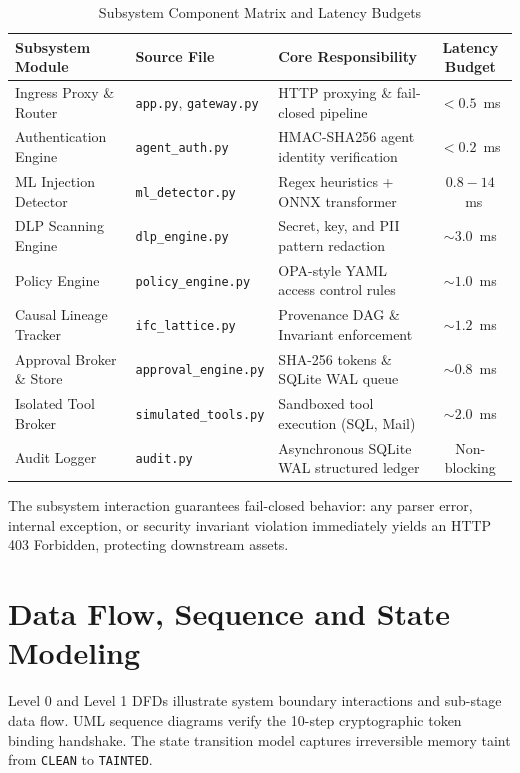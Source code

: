 \begin{table}[htbp]
\centering
\caption{Subsystem Component Matrix and Latency Budgets}
\label{tab:subsystem_matrix}
\begin{tabular}{l l p{5.5cm} c}
\toprule
\textbf{Subsystem Module} & \textbf{Source File} & \textbf{Core Responsibility} & \textbf{Latency Budget} \\
\midrule
Ingress Proxy \& Router & \texttt{app.py}, \texttt{gateway.py} & HTTP proxying \& fail-closed pipeline & $<0.5$~ms \\
Authentication Engine & \texttt{agent\_auth.py} & HMAC-SHA256 agent identity verification & $<0.2$~ms \\
ML Injection Detector & \texttt{ml\_detector.py} & Regex heuristics + ONNX transformer & $0.8 - 14$~ms \\
DLP Scanning Engine & \texttt{dlp\_engine.py} & Secret, key, and PII pattern redaction & $\sim 3.0$~ms \\
Policy Engine & \texttt{policy\_engine.py} & OPA-style YAML access control rules & $\sim 1.0$~ms \\
Causal Lineage Tracker & \texttt{ifc\_lattice.py} & Provenance DAG \& Invariant enforcement & $\sim 1.2$~ms \\
Approval Broker \& Store & \texttt{approval\_engine.py} & SHA-256 tokens \& SQLite WAL queue & $\sim 0.8$~ms \\
Isolated Tool Broker & \texttt{simulated\_tools.py} & Sandboxed tool execution (SQL, Mail) & $\sim 2.0$~ms \\
Audit Logger & \texttt{audit.py} & Asynchronous SQLite WAL structured ledger & Non-blocking \\
\bottomrule
\end{tabular}
\end{table}

The subsystem interaction guarantees fail-closed behavior: any parser error, internal exception, or security invariant violation immediately yields an HTTP 403 Forbidden, protecting downstream assets.

\section{Data Flow, Sequence and State Modeling}
Level 0 and Level 1 DFDs illustrate system boundary interactions and sub-stage data flow. UML sequence diagrams verify the 10-step cryptographic token binding handshake. The state transition model captures irreversible memory taint from \texttt{CLEAN} to \texttt{TAINTED}.

